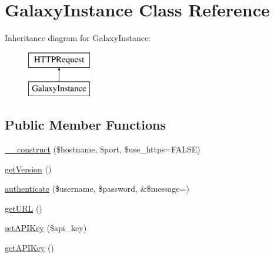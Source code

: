 \hypertarget{classGalaxyInstance}{}\section{Galaxy\+Instance Class Reference}
\label{classGalaxyInstance}
Inheritance diagram for Galaxy\+Instance\+:\begin{figure}[H]
\begin{center}
\leavevmode
\includegraphics[height=2.000000cm]{classGalaxyInstance}
\end{center}
\end{figure}
\subsection*{Public Member Functions}
\begin{DoxyCompactItemize}
\item 
\hyperlink{classGalaxyInstance_a98d1b5f750ce3be53e96e435917b63b1}{\+\_\+\+\_\+construct} (\$hostname, \$port, \$use\+\_\+https=F\+A\+L\+SE)
\item 
\hyperlink{classGalaxyInstance_afbb7256306223f7f8ee85f85868e2de2}{get\+Version} ()
\item 
\hyperlink{classGalaxyInstance_a865740987c5a498a9740a5127838f04e}{authenticate} (\$username, \$password, \&\$message=\textquotesingle{}\textquotesingle{})
\item 
\hyperlink{classGalaxyInstance_a5b0c7191b82c21d857ec3d42068f3cf4}{get\+U\+RL} ()
\item 
\hyperlink{classGalaxyInstance_a4e4c854e91c21917adebec78a655edd3}{set\+A\+P\+I\+Key} (\$api\+\_\+key)
\item 
\hyperlink{classGalaxyInstance_a563deeb4f829462d7476d3684ed099cb}{get\+A\+P\+I\+Key} ()
\end{DoxyCompactItemize}
